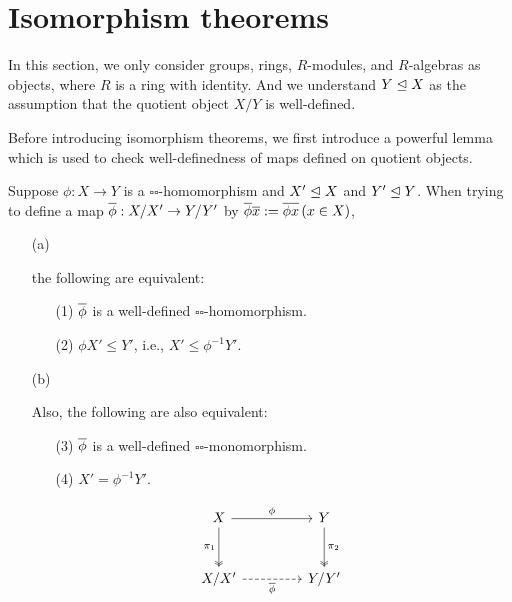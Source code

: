 \section{Isomorphism theorems}

In this section, we only consider groups, rings, $R$-modules, and $R$-algebras as objects, where $R$ is a ring with identity.
And we understand $Y\trianglelefteq X$ as the assumption that the quotient object $X/Y$ is well-defined.

Before introducing isomorphism theorems, we first introduce a powerful lemma which is used to check well-definedness of maps defined on quotient objects.
\begin{lem}\label{well-definedness of maps on quotients}
    Suppose $\phi: X\rightarrow Y$ is a $\square\square$-homomorphism and $X'\trianglelefteq X$ and $Y'\trianglelefteq Y$.
    When trying to define a map $\overline{\phi}: X/X'\rightarrow Y/Y'$ by $\overline{\phi}\overline{x}:=\overline{\phi x}\,(x\in X)$,
    \begin{enumerate}
        \item[(a)]
        {
            the following are equivalent:
            \begin{enumerate}
                \item[(1)]
                {
                    $\overline{\phi}$ is a well-defined $\square\square$-homomorphism.
                }
                \item[(2)]
                {
                    $\phi X'\leq Y'$, i.e., $X'\leq\phi^{-1} Y'$.
                }
            \end{enumerate}
        }
        \item[(b)]
        {
            Also, the following are also equivalent:
            \begin{enumerate}
                \item[(3)]
                {
                    $\overline{\phi}$ is a well-defined $\square\square$-monomorphism.
                }
                \item[(4)]
                {
                    $X'=\phi^{-1}Y'$.
                }
            \end{enumerate}
        }
        \begin{equation*}
        \begin{tikzcd}[row sep=1.0cm, column sep=1.5cm]
            X
            \arrow[r, "\phi"]
            \arrow[d, "\pi_1"', twoheadrightarrow]
            &
            Y
            \arrow[d, "\pi_2", twoheadrightarrow]
            \\
            X/X'
            \arrow[r, "\ol\phi"', dashed]
            &
            Y/Y'
        \end{tikzcd}
        \end{equation*}
    \end{enumerate}
\end{lem}
